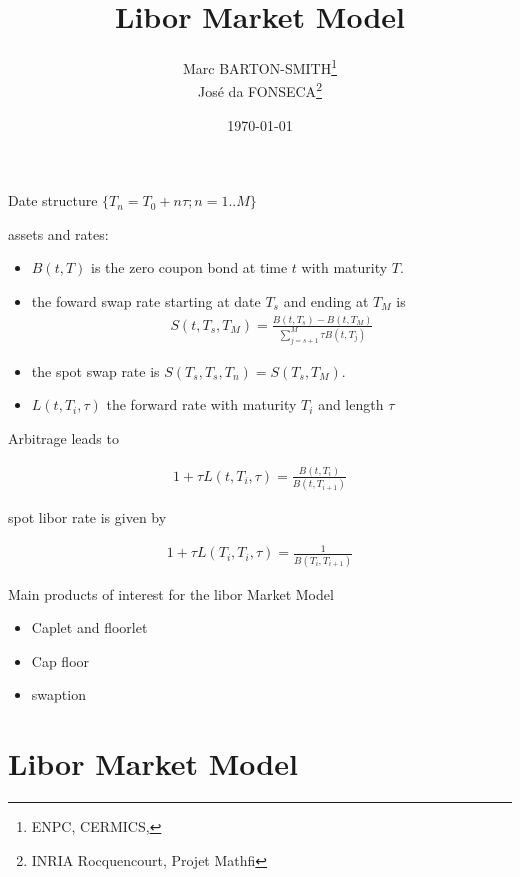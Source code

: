 \documentclass[10pt,a4paper,english,landscape]{slides}
\newcommand{\ban}{\begin{eqnarray*}}
\newcommand{\ean}{\end{eqnarray*}}
\newcommand{\ba}{\begin{eqnarray}}
\newcommand{\ea}{\end{eqnarray}}
\begin{document}
\author{Marc BARTON-SMITH\footnote{ENPC, CERMICS, } \\ \quad Jos\'e da FONSECA\footnote{INRIA Rocquencourt, Projet Mathfi}}
\title{Libor Market Model}
\date{\today}
\maketitle
\thispagestyle{myheadings}
\tableofcontents

\vspace{10mm}



\begin{center}
\end{center}


Date structure $\lbrace T_n=T_0+n\tau ; n=1..M \rbrace $ 

assets and rates:

\begin{itemize}
\item $B(t,T)$ is the zero coupon bond at time $t$ with maturity $T$.  
\item the foward swap rate starting at date $T_s$ and ending at $T_M$ is 
\ban
S(t,T_s,T_M)=\frac{B(t,T_s)-B(t,T_M)}{\sum_{j=s+1}^{M}\tau B(t,T_j)}
\ean

\item the spot swap rate is $S(T_s,T_s,T_n)=S(T_s,T_M)$.
\item $L(t,T_i,\tau)$ the forward rate with maturity $T_i$ and length $\tau$
\end{itemize}


Arbitrage leads to  

\ba
1+\tau L(t,T_i,\tau)=\frac{B(t,T_i)}{B(t,T_{i+1})} 
\ea

spot libor rate is given by 

\ba
1+\tau L(T_i,T_i,\tau)=\frac{1}{B(T_i,T_{i+1})} 
\ea


Main products of interest for the libor Market Model

\begin{itemize}
\item Caplet and floorlet
\item Cap floor
\item swaption
\end{itemize}




\section{Libor Market Model}
\end{document}
